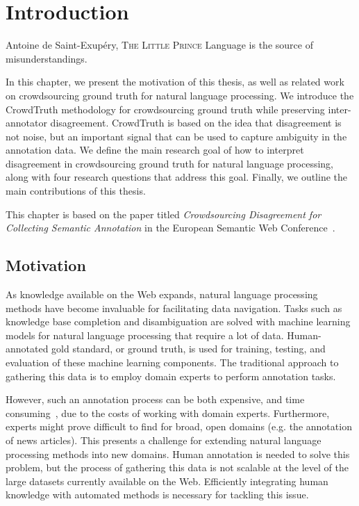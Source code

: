 %
\chapter{Introduction}
\label{chap:intro}

\begin{chapquote}{Antoine de Saint-Exupéry, \textsc{The Little Prince}}
Language is the source of misunderstandings.
\end{chapquote}

In this chapter, we present the motivation of this thesis, as well as related work on crowdsourcing ground truth for natural language processing. We introduce the CrowdTruth methodology for crowdsourcing ground truth while preserving inter-annotator disagreement. CrowdTruth is based on the idea that disagreement is not noise, but an important signal that can be used to capture ambiguity in the annotation data. We define the main research goal of how to interpret disagreement in crowdsourcing ground truth for natural language processing, along with four research questions that address this goal. Finally, we outline the main contributions of this thesis.

This chapter is based on the paper titled \textit{Crowdsourcing Disagreement for Collecting Semantic Annotation} in the European Semantic Web Conference~\cite{dumitrache2015crowdsourcing}.


\section{Motivation}

As knowledge available on the Web expands, natural language processing methods have become invaluable for facilitating data navigation. Tasks such as knowledge base completion and disambiguation are solved with machine learning models for natural language processing that require a lot of data. Human-annotated gold standard, or ground truth, is used for training, testing, and evaluation of these machine learning components. The traditional approach to gathering this data is to employ domain experts to perform annotation tasks.

However, such an annotation process can be both expensive, and time consuming~\cite{aroyo2012harnessing}, due to the costs of working with domain experts. Furthermore, experts might prove difficult to find for broad, open domains (e.g. the annotation of news articles). This presents a challenge for extending natural language processing methods into new domains. Human annotation is needed to solve this problem, but the process of gathering this data is not scalable at the level of the large datasets currently available on the Web. Efficiently integrating human knowledge with automated methods is necessary for tackling this issue. 

